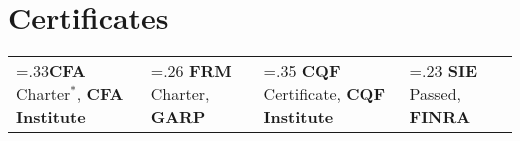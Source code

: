 \documentclass[letterpaper,hidelinks]{article}
\newcommand{\resumeSubHeadingListStart}{\begin{itemize}[leftmargin=0.1in, label={}]}
\newcommand{\resumeSubHeadingListEnd}{\end{itemize}}
\begin{document}
\section{Certificates}
\resumeSubHeadingListStart
\small{\item{
  \begin{tabularx}{0.96\textwidth} { 
     >{\centering\arraybackslash\hsize=.33\hsize}X 
    || >{\centering\arraybackslash\hsize=.26\hsize}X 
    || >{\centering\arraybackslash\hsize=.35\hsize}X  
    || >{\centering\arraybackslash\hsize=.23\hsize}X } 
    \textbf{CFA} Charter$\mathbb{}^\ast$, \textbf{CFA Institute} & 
    \textbf{FRM} Charter, \textbf{GARP} & 
    \textbf{CQF} Certificate, \textbf{CQF Institute} & 
    \textbf{SIE} Passed, \textbf{FINRA}
  \end{tabularx}
}}
\resumeSubHeadingListEnd

\vspace{-11pt}
\end{document}
